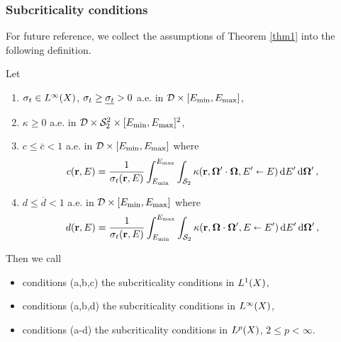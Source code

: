 \subsubsection{Subcriticality conditions}
%
For future reference, we collect the assumptions of Theorem \ref{thm1} into the following definition.
\begin{definition}\label{def:subcriticality}
	Let 
	\begin{enumerate}[label=(\alph*)]
	\item $\sigma_t \in \Lp[\infty](X)$, $\sigma_t \geq \mst > 0$ a.e. in $\VV\times[\Emin,\Emax]$,
	\item $\kappa \geq 0$ a.e. in $\VV\times\Sphere^2\times[\Emin,\Emax]^2$,
	\item $\displaystyle c \leq \bar c < 1$ a.e. in $\VV\times[\Emin,\Emax]$ where
	  \begin{equation*}
	    c(\br,E) = \frac{1}{\sigma_t(\br,E)}\int_{\Emin}^{\Emax}\int_{\Sphere} \kappa(\br,\bomega'\cdot\bomega,
	    E'\sla E)\,\d{E'}\d{\bomega'},
	  \end{equation*}
	 \item $d \leq \overline d < 1$ a.e. in $\VV\times[\Emin,\Emax]$ where
	 $$
	 d(\br,E) = 
  		\frac{1}{\sigma_t(\br,E)}\int_{\Emin}^{\Emax}\int_{\Sphere} \kappa(\br,\bomega\cdot\bomega',
	    E\sla E')\,\d{E'}\d{\bomega'},
	 $$
	\end{enumerate}
	Then we call
	\begin{itemize}
  \item conditions (a,b,c) the subcriticality conditions in $\Lp[1](X)$,
  \item conditions (a,b,d) the subcriticality conditions in $\Lp[\infty](X)$,
  \item conditions (a-d) the subcriticality conditions in $\Lp(X)$, $2\leq p < \infty$.
\end{itemize}
\end{definition}


